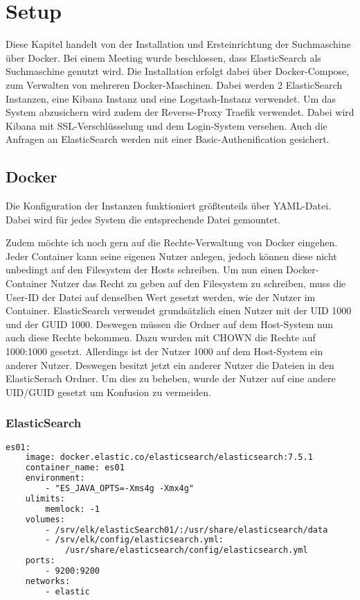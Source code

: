 \chapter{Setup}

Diese Kapitel handelt von der Installation und Ersteinrichtung der Suchmaschine über Docker. Bei einem Meeting wurde beschlossen, dass ElasticSearch als Suchmaschine genutzt wird. Die Installation erfolgt dabei über Docker-Compose, zum Verwalten von mehreren Docker-Maschinen. Dabei werden 2 ElasticSearch Instanzen, eine Kibana Instanz und eine Logstash-Instanz verwendet. Um das System abzusichern wird zudem der Reverse-Proxy Traefik verwendet. Dabei wird Kibana mit SSL-Verschlüsselung und dem Login-System versehen. Auch die Anfragen an ElasticSearch werden mit einer Basic-Authenification gesichert.

\section{Docker}

Die Konfiguration der Instanzen funktioniert größtenteils über YAML-Datei. Dabei wird für jedes System die entsprechende Datei gemountet. 

Zudem möchte ich noch gern auf die Rechte-Verwaltung von Docker eingehen. Jeder Container kann seine eigenen Nutzer anlegen, jedoch können diese nicht unbedingt auf den Filesystem der Hosts schreiben. Um nun einen Docker-Container Nutzer das Recht zu geben auf den Filesystem zu schreiben, muss die User-ID der Datei auf denselben Wert gesetzt werden, wie der Nutzer im Container. ElasticSearch verwendet grundsätzlich einen Nutzer mit der UID 1000 und der GUID 1000. Deswegen müssen die Ordner auf dem Host-System nun auch diese Rechte bekommen. Dazu wurden mit CHOWN die Rechte auf 1000:1000 gesetzt. Allerdings ist der Nutzer 1000 auf dem Host-System ein anderer Nutzer. Deswegen besitzt jetzt ein anderer Nutzer die Dateien in den ElasticSerach Ordner. Um dies zu beheben, wurde der Nutzer auf eine andere UID/GUID gesetzt um Konfusion zu vermeiden. \cite{JarrodWeaver.2014}

\subsection{ElasticSearch}

\begin{lstlisting}[language=XML, frame=single, label={lst:es01}] 
	es01:
	image: docker.elastic.co/elasticsearch/elasticsearch:7.5.1
	container_name: es01
	environment:
		- "ES_JAVA_OPTS=-Xms4g -Xmx4g"
	ulimits:
		memlock: -1
	volumes:
		- /srv/elk/elasticSearch01/:/usr/share/elasticsearch/data
		- /srv/elk/config/elasticsearch.yml:
			/usr/share/elasticsearch/config/elasticsearch.yml
	ports:
		- 9200:9200
	networks:
		- elastic
\end{lstlisting}

